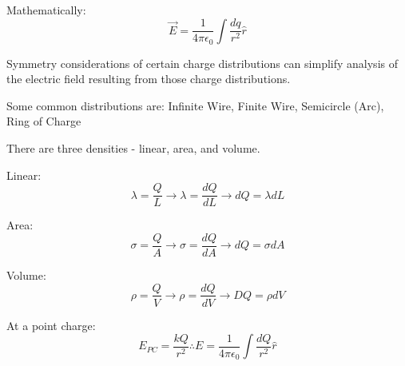 \documentclass[../em.tex]{subfiles}
\begin{document}
Mathematically:
\[\vec{E}=\frac{1}{4\pi\epsilon_0}\int\frac{dq}{r^2}\hat{r}\]

Symmetry considerations of certain charge distributions can simplify analysis of the electric field resulting from those charge distributions.

Some common distributions are: Infinite Wire, Finite Wire, Semicircle (Arc), Ring of Charge 

There are three densities - linear, area, and volume. 

Linear: 
\[\lambda=\frac{Q}{L}\longrightarrow \lambda = \frac{dQ}{dL} \longrightarrow dQ=\lambda dL\]

Area: 
\[\sigma=\frac{Q}{A}\longrightarrow \sigma = \frac{dQ}{dA}\longrightarrow dQ=\sigma dA\]

Volume: 
\[\rho = \frac{Q}{V}\longrightarrow \rho = \frac{dQ}{dV} \longrightarrow DQ=\rho dV\]

At a point charge:
\[E_{PC}=\frac{kQ}{r^2} \therefore E=\frac{1}{4\pi\epsilon_0}\int \frac{dQ}{r^2}\hat{r}\]
\end{document}
